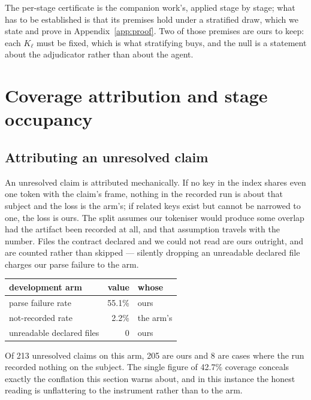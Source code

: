 \documentclass[10pt]{article}
\newcommand{\RM}[1]{{#1}}
\begin{document}
The per-stage certificate is the companion work's, applied stage by stage;
what has to be established is that its premises hold under a stratified draw,
which we state and prove in Appendix~\ref{app:proof}. Two of those premises are
ours to keep: each $K_\ell$ must be fixed, which is what stratifying buys, and
the null is a statement about the adjudicator rather than about the agent.


\section{Coverage attribution and stage occupancy}
\label{app:attribution}

\subsection{Attributing an unresolved claim}

An unresolved claim is attributed mechanically. If no key in the index shares
even one token with the claim's frame, nothing in the recorded run is about that
subject and the loss is the arm's; if related keys exist but cannot be narrowed
to one, the loss is ours. The split assumes our tokeniser would produce some
overlap had the artifact been recorded at all, and that assumption travels with
the number. Files the contract declared and we could not read are ours
outright, and are counted rather than skipped --- silently dropping an
unreadable declared file charges our parse failure to the arm.

\begin{center}
\small
\begin{tabular}{@{}lrl@{}}
\toprule
development arm & value & whose \\
\midrule
parse failure rate & \RM{55.1\%} & ours \\
not-recorded rate & \RM{2.2\%} & the arm's \\
unreadable declared files & \RM{0} & ours \\
\bottomrule
\end{tabular}
\end{center}

\noindent Of \RM{213} unresolved claims on this arm, \RM{205} are ours and
\RM{8} are cases where the run recorded nothing on the subject. The single figure of \RM{42.7\%} coverage conceals
exactly the conflation this section warns about, and in this instance the honest
reading is unflattering to the instrument rather than to the arm.
\end{document}
